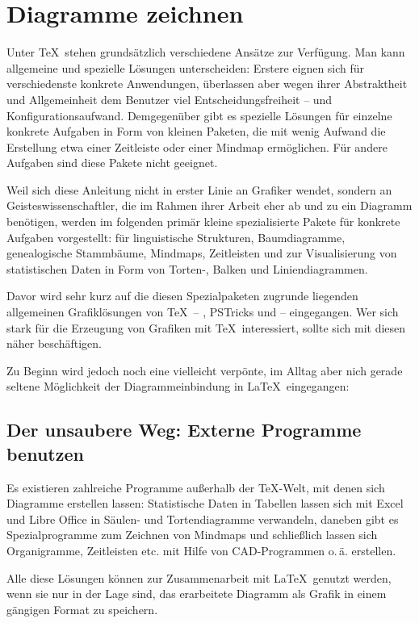 \chapter{Diagramme zeichnen}

Unter \TeX\ stehen grundsätzlich verschiedene Ansätze zur Verfügung. 
Man kann allgemeine und spezielle Lösungen unterscheiden:
Erstere eignen sich für verschiedenste konkrete Anwendungen, überlassen aber wegen ihrer Abstraktheit 
und Allgemeinheit dem Benutzer viel Entscheidungsfreiheit -- und Konfigurationsaufwand. 
Demgegenüber gibt es spezielle Lösungen für einzelne konkrete Aufgaben in Form von kleinen Paketen,
die mit wenig Aufwand die Erstellung etwa einer Zeitleiste oder einer Mindmap ermöglichen.
Für andere Aufgaben sind diese Pakete nicht geeignet.

Weil sich diese Anleitung nicht in erster Linie an Grafiker wendet, sondern an Geisteswissenschaftler,
die im Rahmen ihrer Arbeit eher ab und zu ein Diagramm benötigen, werden im folgenden primär
kleine spezialisierte Pakete für konkrete Aufgaben vorgestellt: 
für linguistische Strukturen,
Baumdiagramme,
genealogische Stammbäume,
Mindmaps,
Zeitleisten 
und zur Visualisierung von statistischen Daten in Form von Torten-, Balken und Liniendiagrammen.

Davor wird sehr kurz auf die diesen Spezialpaketen zugrunde liegenden allgemeinen Grafiklösungen
von \TeX\ -- \METAPOST, PSTricks und \TikZ{} -- eingegangen. Wer sich stark für die Erzeugung von Grafiken
mit \TeX\ interessiert, sollte sich mit diesen näher beschäftigen.

Zu Beginn wird jedoch noch eine vielleicht verpönte, im Alltag aber nich gerade seltene Möglichkeit
der Diagrammeinbindung in \LaTeX\ eingegangen: 

\section{Der unsaubere Weg: Externe Programme benutzen}
Es existieren zahlreiche Programme außerhalb der \TeX-Welt, mit denen sich Diagramme erstellen 
lassen: Statistische Daten in Tabellen lassen sich mit Excel und Libre Office in Säulen- und 
Tortendiagramme verwandeln, daneben gibt es Spezialprogramme zum Zeichnen von Mindmaps
und schließlich lassen sich Organigramme, Zeitleisten etc. mit Hilfe von CAD-Programmen o.\,ä.
erstellen.

Alle diese Lösungen können zur Zusammenarbeit mit \LaTeX\ genutzt werden, wenn sie nur in der 
Lage sind, das erarbeitete Diagramm als Grafik in einem gängigen Format zu speichern.

